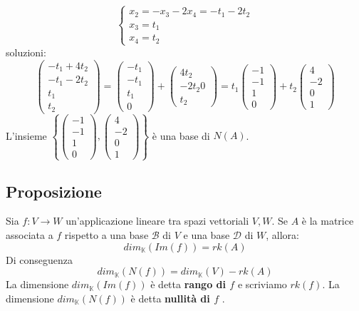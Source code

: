 \documentclass[a4paper]{article}
\theoremstyle{break}
\theoremstyle{break}
\theoremstyle{break}
\theoremstyle{break}
\begin{document}
\begin{example}
\[\begin{cases}
    x_2 = -x_3 -2x_4 = -t_1-2t_2\\
    x_3 = t_1\\
    x_4 = t_2
  \end{cases}
  \] 
  soluzioni:
  \[
  \begin{pmatrix} 
    -t_1 + 4t_2\\
    -t_1 - 2t_2\\
    t_1\\
    t_2
  \end{pmatrix} 
  =
  \begin{pmatrix} 
    -t_1\\
    -t_1\\
    t_1\\
    0
  \end{pmatrix} 
  +
  \begin{pmatrix} 
    4t_2\\
    -2t_2
    0\\
    t_2
  \end{pmatrix} 
  = t_1 \begin{pmatrix} 
    -1\\
    -1\\
    1\\
    0
  \end{pmatrix} 
  +
  t_2 \begin{pmatrix} 
    4\\
    -2\\
    0\\
    1
  \end{pmatrix} 
\]
L'insieme \( \left\{ \begin{pmatrix} 
    -1\\-1\\1\\0
\end{pmatrix},
\begin{pmatrix} 4\\-2\\0\\1 \end{pmatrix} 
\right\}  \) è una base di \( N(A) \).
\end{example}

\subsection{Proposizione}
Sia \( f: V \to W \) un'applicazione lineare tra spazi vettoriali \( V,W \). Se \( A \) 
è la matrice associata a \( f \) rispetto a una base \( \mathcal{B} \) di \( V \) e una
base \( \mathcal{D} \) di \( W \), allora:
\[
  dim_{\mathbb{K}}(Im(f)) = rk(A)
\] 
Di conseguenza 
\[
  dim_{\mathbb{K}}(N(f)) = dim_{\mathbb{K}}(V) - rk(A)
\] 
La dimensione \( dim_{\mathbb{K}}(Im(f)) \) è detta \textbf{rango di \( f \)} e scriviamo
\( rk(f) \). La dimensione \( dim_{\mathbb{K}}(N(f)) \) è detta \textbf{nullità di \( f \) }.
\end{document}
